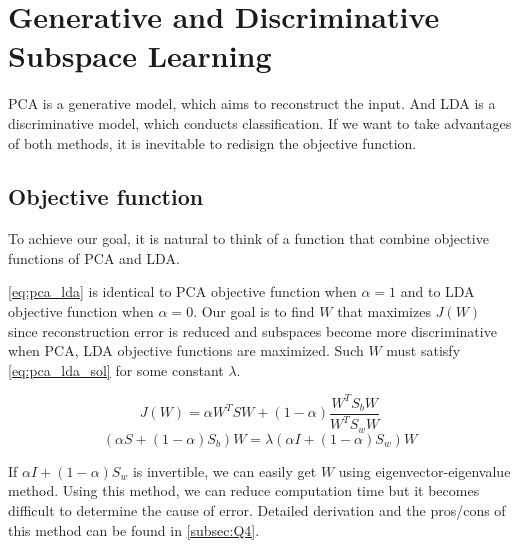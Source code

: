 \section{Generative and Discriminative Subspace Learning}
\label{sec:intro}

PCA is a generative model, which aims to reconstruct the input. And LDA is a discriminative model, which conducts classification. If we want to take advantages of both methods, it is inevitable to redisign the objective function.

\subsection{Objective function}
To achieve our goal, it is natural to think of a function that combine objective functions of PCA and LDA.

\cref{eq:pca_lda} is identical to PCA objective function when $\alpha=1$ and to LDA objective function when $\alpha=0$. Our goal is to find $W$ that maximizes $J(W)$ since reconstruction error is reduced and subspaces become more discriminative when PCA, LDA objective functions are maximized. Such $W$ must satisfy \cref{eq:pca_lda_sol} for some constant $\lambda$.

\vspace{-0.2cm}
\begin{equation}
  J(W) = \alpha W^TSW+(1-\alpha) \frac{W^TS_bW}{W^TS_wW}
  \label{eq:pca_lda}
\end{equation}
\vspace{-0.2cm}
\begin{equation}
  (\alpha S+(1-\alpha)S_b)W = \lambda (\alpha I + (1-\alpha)S_w)W
  \label{eq:pca_lda_sol}
\end{equation}

If $\alpha I + (1-\alpha)S_w$ is invertible, we can easily get $W$ using eigenvector-eigenvalue method. Using this method, we can reduce computation time but it becomes difficult to determine the cause of error. Detailed derivation and the pros/cons of this method can be found in \cref{subsec:Q4}.
